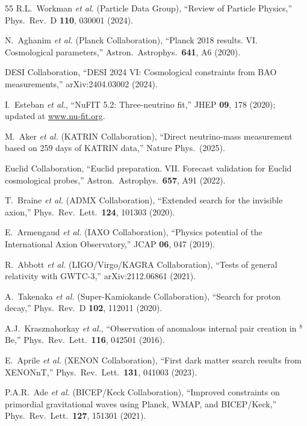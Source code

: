 \documentclass[aps,prd,preprint,superscriptaddress,showpacs,nofootinbib,longbibliography]{revtex4-2}
\begin{document}
\begin{thebibliography}{55}
R.L.~Workman \textit{et al.} (Particle Data Group),
``Review of Particle Physics,''
Phys.\ Rev.\ D \textbf{110}, 030001 (2024).

N.~Aghanim \textit{et al.} (Planck Collaboration),
``Planck 2018 results. VI. Cosmological parameters,''
Astron.\ Astrophys.\ \textbf{641}, A6 (2020).

DESI Collaboration,
``DESI 2024 VI: Cosmological constraints from BAO measurements,''
arXiv:2404.03002 (2024).

I.~Esteban \textit{et al.},
``NuFIT 5.2: Three-neutrino fit,''
JHEP \textbf{09}, 178 (2020); updated at \url{www.nu-fit.org}.

M.~Aker \textit{et al.} (KATRIN Collaboration),
``Direct neutrino-mass measurement based on 259 days of KATRIN data,''
Nature Phys.\ (2025).

Euclid Collaboration,
``Euclid preparation. VII. Forecast validation for Euclid cosmological probes,''
Astron.\ Astrophys.\ \textbf{657}, A91 (2022).

T.~Braine \textit{et al.} (ADMX Collaboration),
``Extended search for the invisible axion,''
Phys.\ Rev.\ Lett.\ \textbf{124}, 101303 (2020).

E.~Armengaud \textit{et al.} (IAXO Collaboration),
``Physics potential of the International Axion Observatory,''
JCAP \textbf{06}, 047 (2019).

R.~Abbott \textit{et al.} (LIGO/Virgo/KAGRA Collaboration),
``Tests of general relativity with GWTC-3,''
arXiv:2112.06861 (2021).

A.~Takenaka \textit{et al.} (Super-Kamiokande Collaboration),
``Search for proton decay,''
Phys.\ Rev.\ D \textbf{102}, 112011 (2020).

A.J.~Krasznahorkay \textit{et al.},
``Observation of anomalous internal pair creation in $^8$Be,''
Phys.\ Rev.\ Lett.\ \textbf{116}, 042501 (2016).

E.~Aprile \textit{et al.} (XENON Collaboration),
``First dark matter search results from XENONnT,''
Phys.\ Rev.\ Lett.\ \textbf{131}, 041003 (2023).

P.A.R.~Ade \textit{et al.} (BICEP/Keck Collaboration),
``Improved constraints on primordial gravitational waves using Planck, WMAP, and BICEP/Keck,''
Phys.\ Rev.\ Lett.\ \textbf{127}, 151301 (2021).


\end{thebibliography}
\end{document}
